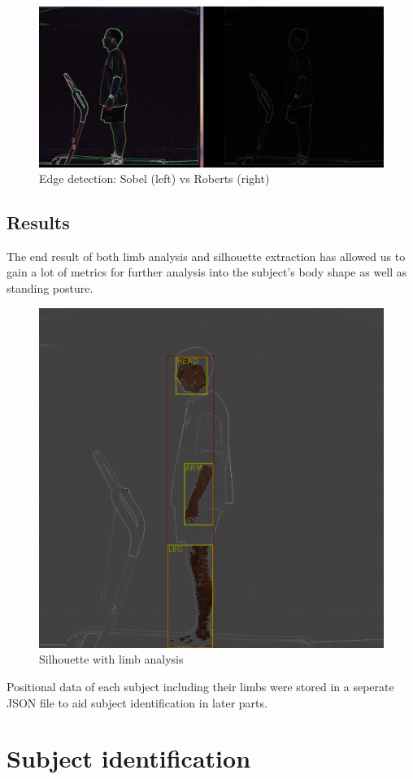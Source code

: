 \documentclass[10pt,journal,compsoc]{IEEEtran}
\begin{document}
\begin{figure}[!htb]
\centering
\includegraphics[width=0.7\linewidth]{edgeDetectionComp}
    \caption{Edge detection: Sobel (left) vs Roberts (right)}
\end{figure}

\subsection{Results}
The end result of both limb analysis and silhouette extraction has allowed us to gain a lot of metrics for further analysis into the subject's body shape as well as standing posture.

\begin{figure}[!htb]
\centering
\includegraphics[width=0.7\linewidth]{combined}
    \caption{Silhouette with limb analysis}
\end{figure}

Positional data of each subject including their limbs were stored in a seperate JSON file to aid subject identification in later parts.



\section{Subject identification}
\end{document}

